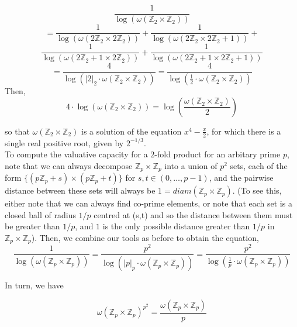\[
\frac{1}{\log(\omega(\mathbb{Z}_2 \times \mathbb{Z}_2))} \]
\[ = \frac{1}{\log(\omega(2\mathbb{Z}_2 \times 2\mathbb{Z}_2))} + \frac{1}{\log(\omega(2\mathbb{Z}_2 \times 2\mathbb{Z}_2 +1))} +\] \[ \frac{1}{\log(\omega(2\mathbb{Z}_2+1 \times 2\mathbb{Z}_2))} + \frac{1}{\log(\omega(2\mathbb{Z}_2+1 \times 2\mathbb{Z}_2+1))}\]
\[ = \frac{4}{\log(\lvert 2 \rvert_2 \cdot \omega(\mathbb{Z}_2 \times \mathbb{Z}_2))} = \frac{4}{\log(\frac{1}{2} \cdot \omega(\mathbb{Z}_2 \times \mathbb{Z}_2))}\]%
Then,
\[4\cdot \log(\omega(\mathbb{Z}_2 \times \mathbb{Z}_2)) =\log(\frac{\omega(\mathbb{Z}_2 \times \mathbb{Z}_2)}{2}) \]



so that ${\omega(\mathbb{Z}_2 \times \mathbb{Z}_2)}$ is a solution of the equation $x^4 - \frac{x}{2}$, for which there is a single real positive root, given by $2^{-1/3}$.\\


To compute the valuative capacity for a $2$-fold product for an arbitary prime $p$, note that we can always decompose $\mathbb{Z}_p \times \mathbb{Z}_p$ into a union of $p^2$ sets, each of the form $\{(p\mathbb{Z}_p+s) \times (p\mathbb{Z}_p +t)\}$ for $s,t \in (0,\ldots, p-1)$, and the pairwise distance between these sets will always be $1 = diam(\mathbb{Z}_p \times \mathbb{Z}_p)$. (To see this, either note that we can always find co-prime elements, or note that each set is a closed ball of radius $1/p$ centred at (s,t) and so the distance between them must be greater than $1/p$, and $1$ is the only possible distance greater than $1/p$ in $\mathbb{Z}_p \times \mathbb{Z}_p$).  Then, we combine our tools as before to obtain the equation,\\

\[\frac{1}{\log(\omega(\mathbb{Z}_p \times \mathbb{Z}_p))} = \frac{p^2}{\log(\lvert p \rvert_p \cdot \omega(\mathbb{Z}_p \times \mathbb{Z}_p))} =  \frac{p^2}{\log(\frac{1}{p} \cdot \omega(\mathbb{Z}_p \times \mathbb{Z}_p))}    \]

In turn, we have 

\[ \omega(\mathbb{Z}_p \times \mathbb{Z}_p)^{p^2} =  \frac{\omega(\mathbb{Z}_p \times \mathbb{Z}_p)}{p}  \]

